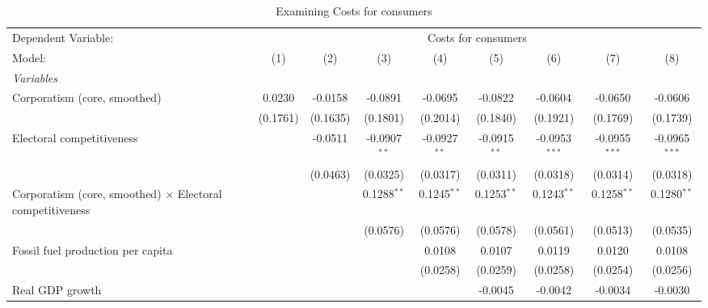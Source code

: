 
\begin{table}[htbp]
   \caption{Examining Costs for consumers}
   \centering
   \begin{tabular}{lcccccccc}
      \tabularnewline \midrule \midrule
      Dependent Variable: & \multicolumn{8}{c}{Costs for consumers}\\
      Model:                                                           & (1)      & (2)      & (3)            & (4)            & (5)            & (6)             & (7)             & (8)\\  
      \midrule
      \emph{Variables}\\
      Corporatism (core, smoothed)                                     & 0.0230   & -0.0158  & -0.0891        & -0.0695        & -0.0822        & -0.0604         & -0.0650         & -0.0606\\   
                                                                       & (0.1761) & (0.1635) & (0.1801)       & (0.2014)       & (0.1840)       & (0.1921)        & (0.1769)        & (0.1739)\\   
      Electoral competitiveness                                        &          & -0.0511  & -0.0907$^{**}$ & -0.0927$^{**}$ & -0.0915$^{**}$ & -0.0953$^{***}$ & -0.0955$^{***}$ & -0.0965$^{***}$\\   
                                                                       &          & (0.0463) & (0.0325)       & (0.0317)       & (0.0311)       & (0.0318)        & (0.0314)        & (0.0318)\\   
      Corporatism (core, smoothed) $\times$ Electoral competitiveness  &          &          & 0.1288$^{**}$  & 0.1245$^{**}$  & 0.1253$^{**}$  & 0.1243$^{**}$   & 0.1258$^{**}$   & 0.1280$^{**}$\\   
                                                                       &          &          & (0.0576)       & (0.0576)       & (0.0578)       & (0.0561)        & (0.0513)        & (0.0535)\\   
      Fossil fuel production per capita                                &          &          &                & 0.0108         & 0.0107         & 0.0119          & 0.0120          & 0.0108\\   
                                                                       &          &          &                & (0.0258)       & (0.0259)       & (0.0258)        & (0.0254)        & (0.0256)\\   
      Real GDP growth                                                  &          &          &                &                & -0.0045        & -0.0042         & -0.0034         & -0.0030\\   

\end{tabular}
\end{table}

